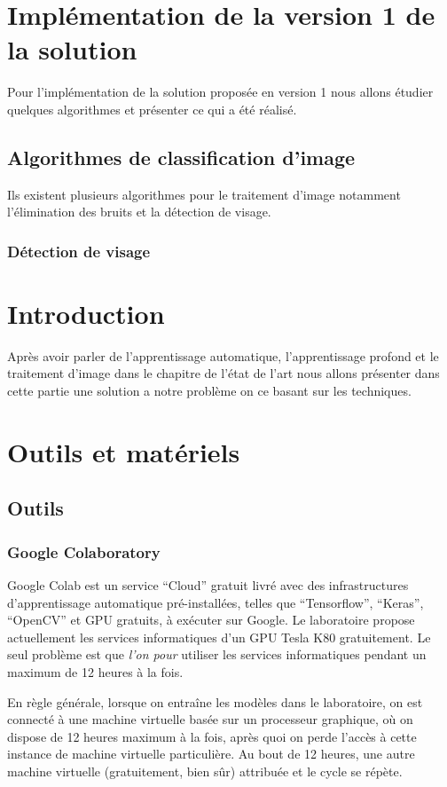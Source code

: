 \documentclass[12pt]{article}
\begin{document}
\section{Implémentation de la version 1 de la solution}
Pour l'implémentation de la solution proposée en version 1 nous allons étudier quelques algorithmes et présenter ce qui a été réalisé.

\subsection{Algorithmes de classification d'image}
Ils existent plusieurs algorithmes pour le traitement d'image notamment l'élimination des bruits et la détection de visage.

\subsubsection*{Détection de visage}

\section{Introduction}
Après avoir parler de l’apprentissage automatique, l’apprentissage profond et le traitement d’image dans le chapitre de l’état de l’art nous allons présenter dans cette partie une solution a notre problème on ce basant sur les techniques.

\section{Outils et matériels}
\subsection{Outils}
\subsubsection*{Google Colaboratory}
Google Colab est un service “Cloud” gratuit livré avec des infrastructures d’apprentissage automatique pré-installées, telles que “Tensorflow”, “Keras”, “OpenCV” et GPU gratuits, à exécuter sur Google. Le laboratoire propose actuellement les services informatiques d’un GPU Tesla K80 gratuitement. Le seul problème est que \textit{l'on pour} utiliser les services informatiques pendant un maximum de 12 heures à la fois. 

En règle générale, lorsque on entraîne les modèles dans le laboratoire, on est connecté à une machine virtuelle basée sur un processeur graphique, où on dispose de 12 heures maximum à la fois, après quoi on perde l'accès à cette instance de machine virtuelle particulière. Au bout de 12 heures, une autre machine virtuelle (gratuitement, bien sûr)  attribuée et le cycle se répète.
\end{document}
